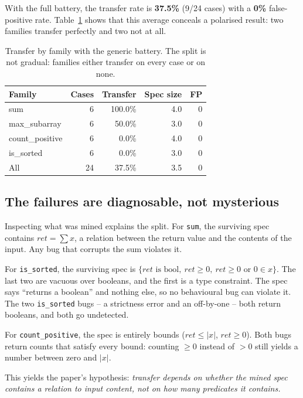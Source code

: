 \documentclass[conference]{IEEEtran}
\begin{document}
With the full battery, the transfer rate is \textbf{37.5\%} (9/24 cases) with a
\textbf{0\%} false-positive rate. Table~\ref{tab:fam} shows that this average conceals a
polarised result: two families transfer perfectly and two not at all.

\begin{table}[t]
\centering
\caption{Transfer by family with the generic battery. The split is not gradual: families
either transfer on every case or on none.}
\label{tab:fam}
\small
\begin{tabular}{@{}lrrrr@{}}
\toprule
Family & Cases & Transfer & Spec size & FP \\
\midrule
sum & 6 & 100.0\% & 4.0 & 0 \\
max\_subarray & 6 & 50.0\% & 3.0 & 0 \\
count\_positive & 6 & 0.0\% & 4.0 & 0 \\
is\_sorted & 6 & 0.0\% & 3.0 & 0 \\
\midrule
All & 24 & 37.5\% & 3.5 & 0 \\
\bottomrule
\end{tabular}
\end{table}

\subsection{The failures are diagnosable, not mysterious}

Inspecting what was mined explains the split. For \texttt{sum}, the surviving spec
contains $\mathit{ret} = \sum x$, a relation between the return value and the contents of
the input. Any bug that corrupts the sum violates it.

For \texttt{is\_sorted}, the surviving spec is
$\{\mathit{ret}\text{ is bool},\ \mathit{ret} \ge 0,\ \mathit{ret} \ge 0 \text{ or } 0 \in x\}$.
The last two are vacuous over booleans, and the first is a type constraint. The spec says
``returns a boolean'' and nothing else, so no behavioural bug can violate it. The two
\texttt{is\_sorted} bugs -- a strictness error and an off-by-one -- both return booleans, and
both go undetected.

For \texttt{count\_positive}, the spec is entirely bounds
($\mathit{ret} \le |x|$, $\mathit{ret} \ge 0$). Both bugs return counts that satisfy every
bound: counting $\ge 0$ instead of $>0$ still yields a number between zero and $|x|$.

This yields the paper's hypothesis: \emph{transfer depends on whether the mined spec
contains a relation to input content, not on how many predicates it contains.}
\end{document}
